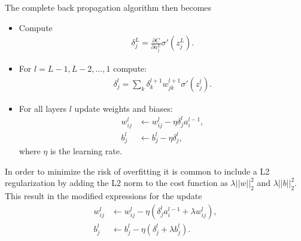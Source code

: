 The complete back propagation algorithm then becomes 
\begin{itemize}
    \item Compute
    \begin{align*}
    \delta_j^L =  \frac{\partial C}{\partial a_j^L}\sigma'( z_j^L). 
    \end{align*}
    \item For $l = L-1, L-2, \hdots, 1$   compute:
    \begin{align*}
        \delta_j^l = \sum_k  \delta_k^{l+1}  w_{jk}^{l+1}\sigma'(z_j^l).
    \end{align*}
    \item For all layers $l$ update weights and biases: 
    \begin{align*}
        w_{ij}^l &\leftarrow w_{ij}^l - \eta \delta_j^l a_i^{l-1}, \\
        b_j^l &\leftarrow b_j^l - \eta \delta_j^l,
    \end{align*}
    where $\eta$ is the learning rate.
\end{itemize}
In order to minimize the risk of overfitting it is common to include a L2 regularization by adding the L2 norm to the cost function as $\lambda||w||_2^2$ and $\lambda||b||_2^2$.
This result in the modified expressions for the update 
\begin{equation*}
    \begin{aligned}
        w_{ij}^l &\leftarrow w_{ij}^l - \eta ( \delta_j^l a_i^{l-1} + \lambda w_{ij}^l ), \\
            b_j^l &\leftarrow b_j^l - \eta (\delta_j^l + \lambda b_{j}^l).
     \end{aligned}
\end{equation*}
